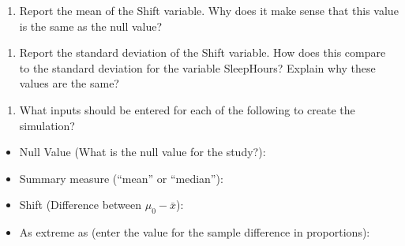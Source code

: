 \documentclass[
]{report}
\providecommand{\tightlist}{%
  \setlength{\itemsep}{0pt}\setlength{\parskip}{0pt}}
\begin{document}
\begin{enumerate}
\def\labelenumi{\arabic{enumi}.}
\setcounter{enumi}{6}
\tightlist
\item
  Report the mean of the Shift variable. Why does it make sense that this value is the same as the null value?
\end{enumerate}

\vspace{0.9in}

\begin{enumerate}
\def\labelenumi{\arabic{enumi}.}
\setcounter{enumi}{7}
\tightlist
\item
  Report the standard deviation of the Shift variable. How does this compare to the standard deviation for the variable SleepHours? Explain why these values are the same?
\end{enumerate}

\vspace{0.9in}

\begin{enumerate}
\def\labelenumi{\arabic{enumi}.}
\setcounter{enumi}{8}
\tightlist
\item
  What inputs should be entered for each of the following to create the simulation?
  \vspace{1mm}
\end{enumerate}

\begin{itemize}
\tightlist
\item
  Null Value (What is the null value for the study?):
\end{itemize}

\vspace{.15in}

\begin{itemize}
\tightlist
\item
  Summary measure (``mean'' or ``median''):
\end{itemize}

\vspace{0.15in}

\begin{itemize}
\tightlist
\item
  Shift (Difference between \(\mu_0 -\bar{x}\)):
\end{itemize}

\vspace{0.15in}

\begin{itemize}
\tightlist
\item
  As extreme as (enter the value for the sample difference in proportions):
\end{itemize}
\end{document}
